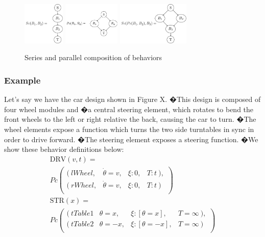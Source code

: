 \documentclass[conference]{IEEEtran}
\theoremstyle{definition}
\begin{document}
\begin{figure}
\begin{center}
\includegraphics[height=0.8in]{images/tikz/series.pdf}
\includegraphics[height=0.8in]{images/tikz/parallel.pdf} \vspace{0.in}
\includegraphics[height=0.8in]{images/tikz/parallel-and-series.pdf}
\end{center}
\caption{Series and parallel composition of behaviors }
\label{fig:graph-composition}
\end{figure}

\subsubsection*{Example}
Let's say we have the
car design shown in Figure X. �This design is composed of four wheel modules
and �a central steering element, which rotates to bend the front wheels to the
left or right relative the back, causing the car to turn. �The wheel elements
expose a function which turns the two side turntables in sync in order to drive
forward. �The steering element exposes a steering function. �We
show these behavior  definitions below:
\begin{align*}
%
\mathrm{DRV}(v,t) =~~~~~~~~~~~~~~~~~~~~~~~~~~~~~~~~~~~~~~~~~~~~~~~~~~~ \\
Pc \left( \begin{array}{cccc}
(~lWheel, & \dot\theta=v, & \xi:0, & T:t~), \\
(~rWheel, & \dot\theta=v, & \xi:0, & T:t~) \\
\end{array} \right)\\
%
\mathrm{ST R}(x) = ~~~~~~~~~~~~~~~~~~~~~~~~~~~~~~~~~~~~~~~~~~~~~~~~~~~~ \\ 
Pc \left( \begin{array}{cccc}
(~tTable1 & \theta=x, & \xi:[\theta=x], & T=\infty~), \\
(~tTable2 & \theta=-x, & \xi: [\theta=-x], & T=\infty~) \\
\end{array} \right)
%
\end{align*}
\end{document}
